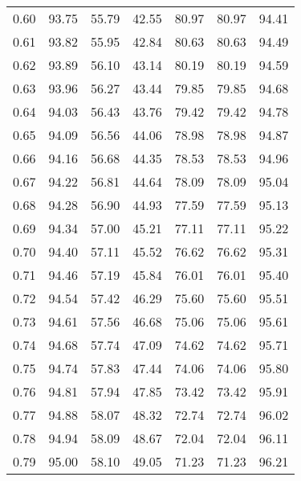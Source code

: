 \begin{tabular}{|c|c|c|c|c|c|c|}
      0.60 &     93.75 &     55.79 &      42.55 &   80.97 &      80.97 &         94.41 \\
      0.61 &     93.82 &     55.95 &      42.84 &   80.63 &      80.63 &         94.49 \\
      0.62 &     93.89 &     56.10 &      43.14 &   80.19 &      80.19 &         94.59 \\
      0.63 &     93.96 &     56.27 &      43.44 &   79.85 &      79.85 &         94.68 \\
      0.64 &     94.03 &     56.43 &      43.76 &   79.42 &      79.42 &         94.78 \\
      0.65 &     94.09 &     56.56 &      44.06 &   78.98 &      78.98 &         94.87 \\
      0.66 &     94.16 &     56.68 &      44.35 &   78.53 &      78.53 &         94.96 \\
      0.67 &     94.22 &     56.81 &      44.64 &   78.09 &      78.09 &         95.04 \\
      0.68 &     94.28 &     56.90 &      44.93 &   77.59 &      77.59 &         95.13 \\
      0.69 &     94.34 &     57.00 &      45.21 &   77.11 &      77.11 &         95.22 \\
      0.70 &     94.40 &     57.11 &      45.52 &   76.62 &      76.62 &         95.31 \\
      0.71 &     94.46 &     57.19 &      45.84 &   76.01 &      76.01 &         95.40 \\
      0.72 &     94.54 &     57.42 &      46.29 &   75.60 &      75.60 &         95.51 \\
      0.73 &     94.61 &     57.56 &      46.68 &   75.06 &      75.06 &         95.61 \\
      0.74 &     94.68 &     57.74 &      47.09 &   74.62 &      74.62 &         95.71 \\
      0.75 &     94.74 &     57.83 &      47.44 &   74.06 &      74.06 &         95.80 \\
      0.76 &     94.81 &     57.94 &      47.85 &   73.42 &      73.42 &         95.91 \\
      0.77 &     94.88 &     58.07 &      48.32 &   72.74 &      72.74 &         96.02 \\
      0.78 &     94.94 &     58.09 &      48.67 &   72.04 &      72.04 &         96.11 \\
      0.79 &     95.00 &     58.10 &      49.05 &   71.23 &      71.23 &         96.21 \\

\end{tabular}
